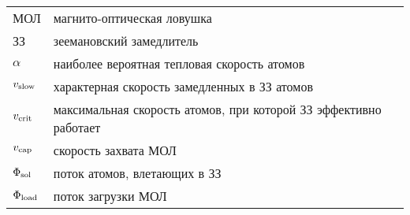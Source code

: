 

 
\begin{tabular}{llc}
	МОЛ & магнито-оптическая ловушка & \pageref{subsec:мол} \\ 
	ЗЗ & зеемановский замедлитель \\
	$\alpha$ & наиболее вероятная тепловая скорость атомов & \pageref{Поток атомов на выходе}\\ 
	$v_{\textnormal{slow}}$ &  характерная скорость замедленных в ЗЗ атомов & \pageref{Тормозящая сила} \\
	$v_{\textnormal{crit}}$ & максимальная скорость атомов, при которой ЗЗ эффективно работает  & \pageref{Тормозящая сила} \\
	$v_{\textnormal{cap}}$ & скорость захвата МОЛ & \pageref{Эффективность замедлителя} \\
	$\Phi_{\textnormal{sol}}$ & поток атомов, влетающих в ЗЗ & \pageref{Поток атомов на выходе} \\
	$\Phi_{\textnormal{load}}$ & поток загрузки МОЛ & \pageref{Динамика количества атомов в МОЛ} \\
\end{tabular}

